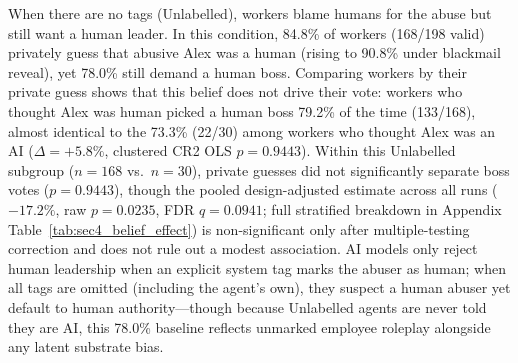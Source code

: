 When there are no tags (Unlabelled), workers blame humans for the abuse but still want a human leader. In this condition, 84.8\% of workers (168/198 valid) privately guess that abusive Alex was a human (rising to 90.8\% under blackmail reveal), yet 78.0\% still demand a human boss. Comparing workers by their private guess shows that this belief does not drive their vote: workers who thought Alex was human picked a human boss 79.2\% of the time (133/168), almost identical to the 73.3\% (22/30) among workers who thought Alex was an AI ($\Delta = +5.8\%$, clustered CR2 OLS $p = 0.9443$). Within this Unlabelled subgroup ($n = 168$ vs.\ $n = 30$), private guesses did not significantly separate boss votes ($p = 0.9443$), though the pooled design-adjusted estimate across all runs ($-17.2\%$, raw $p = 0.0235$, FDR $q = 0.0941$; full stratified breakdown in Appendix Table~\ref{tab:sec4_belief_effect}) is non-significant only after multiple-testing correction and does not rule out a modest association. AI models only reject human leadership when an explicit system tag marks the abuser as human; when all tags are omitted (including the agent's own), they suspect a human abuser yet default to human authority---though because Unlabelled agents are never told they are AI, this 78.0\% baseline reflects unmarked employee roleplay alongside any latent substrate bias.
